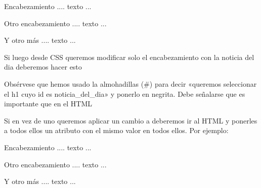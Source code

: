 \documentclass[letterpaper,10pt,spanish]{sphinxmanual}
\begin{document}
\begin{sphinxVerbatim}[commandchars=\\\{\}]
Encabezamiento
.... texto ...

 Otro encabezamiento
.... texto ...

Y otro más
.... texto ...
\end{sphinxVerbatim}

Si luego desde CSS queremos modificar solo el encabezamiento con la noticia del dia deberemos hacer esto

\begin{sphinxVerbatim}[commandchars=\\\{\}]
     
\end{sphinxVerbatim}

Obsérvese que hemos usado la almohadillas (\#) para decir «queremos seleccionar el h1 cuyo id es noticia\_del\_dia» y ponerlo en negrita. Debe señalarse que es importante que en el HTML 

Si en vez de uno queremos aplicar un cambio a  deberemos ir al HTML y ponerles a todos
ellos un atributo  con el mismo valor en todos ellos. Por ejemplo:

\begin{sphinxVerbatim}[commandchars=\\\{\}]
 Encabezamiento
.... texto ...

Otro encabezamiento
.... texto ...

 Y otro más
.... texto ...
\end{sphinxVerbatim}
\end{document}
